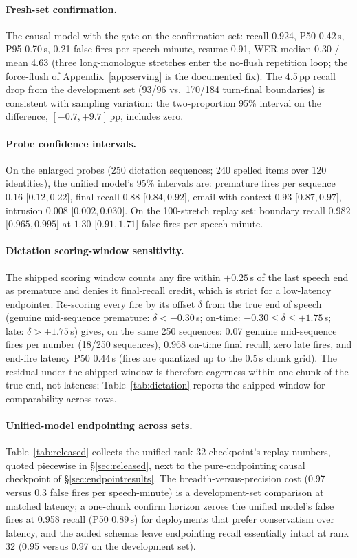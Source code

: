 \documentclass[11pt]{article}
\begin{document}
\paragraph{Fresh-set confirmation.} The causal model with the gate on the confirmation set: recall 0.924, P50 0.42\,s, P95 0.70\,s, 0.21 false fires per speech-minute, resume 0.91, WER median 0.30 / mean 4.63 (three long-monologue stretches enter the no-flush repetition loop; the force-flush of Appendix~\ref{app:serving} is the documented fix). The 4.5\,pp recall drop from the development set (93/96 vs.\ 170/184 turn-final boundaries) is consistent with sampling variation: the two-proportion 95\% interval on the difference, $[-0.7,+9.7]$\,pp, includes zero.

\paragraph{Probe confidence intervals.} On the enlarged probes (250 dictation sequences; 240 spelled items over 120 identities), the unified model's 95\% intervals are: premature fires per sequence $0.16$ [$0.12,0.22$], final recall $0.88$ [$0.84,0.92$], email-with-context $0.93$ [$0.87,0.97$], intrusion $0.008$ [$0.002,0.030$]. On the 100-stretch replay set: boundary recall $0.982$ [$0.965,0.995$] at $1.30$ [$0.91,1.71$] false fires per speech-minute.

\paragraph{Dictation scoring-window sensitivity.} The shipped scoring window counts any fire within $+0.25$\,s of the last speech end as premature and denies it final-recall credit, which is strict for a low-latency endpointer. Re-scoring every fire by its offset $\delta$ from the true end of speech (genuine mid-sequence premature: $\delta<-0.30$\,s; on-time: $-0.30\le\delta\le+1.75$\,s; late: $\delta>+1.75$\,s) gives, on the same 250 sequences: 0.07 genuine mid-sequence fires per number (18/250 sequences), 0.968 on-time final recall, zero late fires, and end-fire latency P50 0.44\,s (fires are quantized up to the 0.5\,s chunk grid). The residual under the shipped window is therefore eagerness within one chunk of the true end, not lateness; Table~\ref{tab:dictation} reports the shipped window for comparability across rows.

\paragraph{Unified-model endpointing across sets.} Table~\ref{tab:released} collects the unified rank-32 checkpoint's replay numbers, quoted piecewise in \S\ref{sec:released}, next to the pure-endpointing causal checkpoint of \S\ref{sec:endpointresults}. The breadth-versus-precision cost (0.97 versus 0.3 false fires per speech-minute) is a development-set comparison at matched latency; a one-chunk confirm horizon zeroes the unified model's false fires at 0.958 recall (P50 0.89\,s) for deployments that prefer conservatism over latency, and the added schemas leave endpointing recall essentially intact at rank 32 (0.95 versus 0.97 on the development set).
\end{document}
